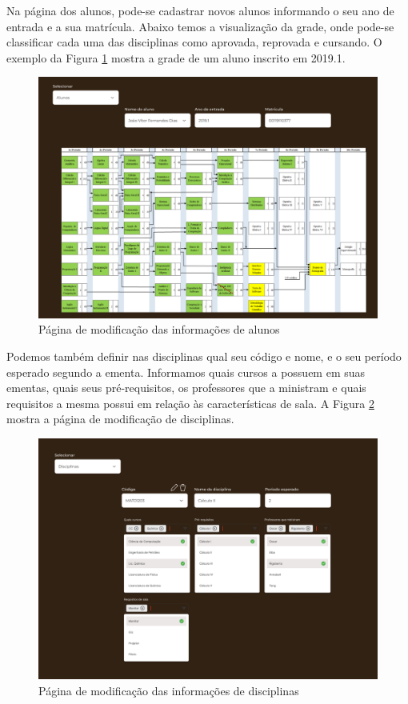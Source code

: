Na página dos alunos, pode-se cadastrar novos alunos informando o seu ano de entrada e a sua matrícula. Abaixo temos a visualização da grade, onde pode-se classificar cada uma das disciplinas como aprovada, reprovada e cursando. O exemplo da Figura \ref{fig:CRUD_alunos} mostra a grade de um aluno inscrito em 2019.1.

\begin{figure}[htbp]\centering
  \caption{\label{fig:CRUD_alunos} Página de modificação das informações de alunos}
  \includegraphics[scale=0.6]{files/img/Prototipo/Medio/CRUD_alunos.png}
\end{figure} %

Podemos também definir nas disciplinas qual seu código e nome, e o seu período esperado segundo a ementa. Informamos quais cursos a possuem em suas ementas, quais seus pré-requisitos, os professores que a ministram e quais requisitos a mesma possui em relação às características de sala. A Figura \ref{fig:CRUD_disciplinas} mostra a página de modificação de disciplinas.

\begin{figure}[htbp]\centering
  \caption{\label{fig:CRUD_disciplinas} Página de modificação das informações de disciplinas}
  \includegraphics[scale=0.6]{files/img/Prototipo/Medio/CRUD_disciplinas.png}
\end{figure} %

